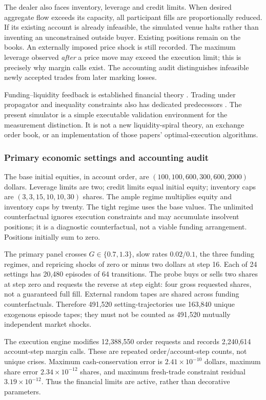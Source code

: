 \documentclass[10pt,twocolumn,letterpaper]{article}
\theoremstyle{definition}
\theoremstyle{remark}
\begin{document}
The dealer also faces inventory, leverage and credit limits. When desired aggregate flow exceeds its capacity, all participant fills are proportionally reduced. If its existing account is already infeasible, the simulated venue halts rather than inventing an unconstrained outside buyer. Existing positions remain on the books. An externally imposed price shock is still recorded. The maximum leverage observed \emph{after} a price move may exceed the execution limit; this is precisely why margin calls exist. The accounting audit distinguishes infeasible newly accepted trades from later marking losses.

Funding--liquidity feedback is established financial theory \citep{brunnermeier2009}. Trading under propagator and inequality constraints also has dedicated predecessors \citep{abijaber2024}. The present simulator is a simple executable validation environment for the measurement distinction. It is not a new liquidity-spiral theory, an exchange order book, or an implementation of those papers' optimal-execution algorithms.

\subsubsection{Primary economic settings and accounting audit}
The base initial equities, in account order, are $(100,100,600,300,600,2000)$ dollars. Leverage limits are two; credit limits equal initial equity; inventory caps are $(3,3,15,10,10,30)$ shares. The ample regime multiplies equity and inventory caps by twenty. The tight regime uses the base values. The unlimited counterfactual ignores execution constraints and may accumulate insolvent positions; it is a diagnostic counterfactual, not a viable funding arrangement. Positions initially sum to zero.

The primary panel crosses $G\in\{0.7,1.3\}$, slow rates $0.02/0.1$, the three funding regimes, and repricing shocks of zero or minus two dollars at step 16. Each of 24 settings has 20,480 episodes of 64 transitions. The probe buys or sells two shares at step zero and requests the reverse at step eight: four gross requested shares, not a guaranteed full fill. External random tapes are shared across funding counterfactuals. Therefore 491,520 setting-trajectories use 163,840 unique exogenous episode tapes; they must not be counted as 491,520 mutually independent market shocks.

The execution engine modifies 12,388,550 order requests and records 2,240,614 account-step margin calls. These are repeated order/account-step counts, not unique crises. Maximum cash-conservation error is $2.41\times10^{-10}$ dollars, maximum share error $2.34\times10^{-12}$ shares, and maximum fresh-trade constraint residual $3.19\times10^{-12}$. Thus the financial limits are active, rather than decorative parameters.
\end{document}
